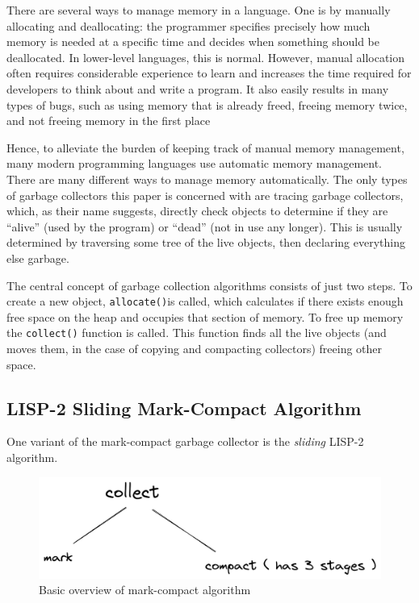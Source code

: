 \documentclass[index]{subfiles}
\begin{document}
There are several ways to manage memory in a language. One is by manually allocating and deallocating: the programmer specifies precisely how much memory is needed at a specific time and decides when something should be deallocated. In lower-level languages, this is normal. However, manual allocation often requires considerable experience to learn and increases the time required for developers to think about and write a program. It also easily results in many types of bugs, such as using memory that is already freed, freeing memory twice, and not freeing memory in the first place \cites{garbage_collection_overview_uw}[Chapter~1]{gc_handbook}

Hence, to alleviate the burden of keeping track of manual memory management, many modern programming languages use automatic memory management. There are many different ways to manage memory automatically. The only types of garbage collectors this paper is concerned with are tracing garbage collectors, which, as their name suggests, directly check objects to determine if they are ``alive'' (used by the program) or ``dead'' (not in use any longer)\cite{a_unified_theory_of_garbage_collection}. This is usually determined by traversing some tree of the live objects\cite[Chapter~1]{gc_handbook}, then declaring everything else garbage.

The central concept of garbage collection algorithms consists of just two steps. To create a new object, \verb+allocate()+is called, which calculates if there exists enough free space on the heap and occupies that section of memory. To free up memory the \verb+collect()+\cite{gc_handbook} function is called. This function finds all the live objects (and moves them, in the case of copying and compacting collectors) freeing other space. %

\subsection{LISP-2 Sliding Mark-Compact Algorithm}

One variant of the mark-compact garbage collector is the \textit{sliding} LISP-2 algorithm.

\begin{figure}[H]
    \centering
    \includegraphics[scale=0.3]{pics/mark-compact-overview.png}
    \caption{Basic overview of mark-compact algorithm}
\end{figure}
\end{document}
